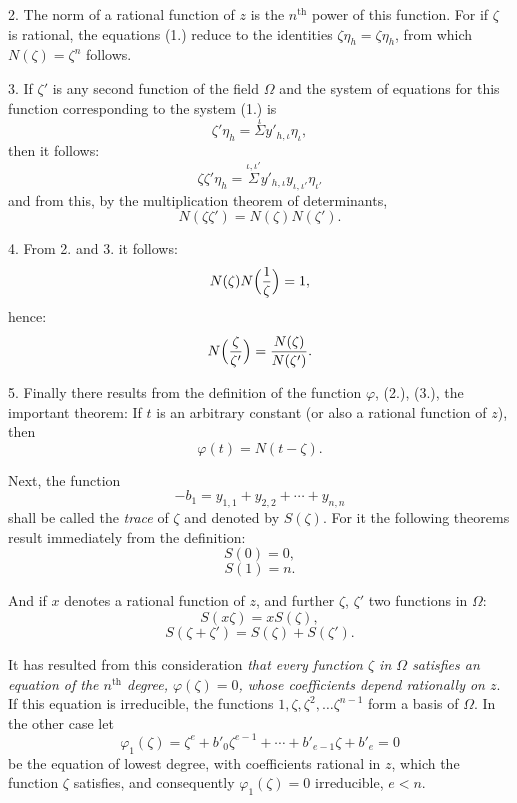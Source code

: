 \documentclass{article}
\begin{document}
2. The norm of a rational function of $z$ is the $n^{\text{th}}$ power of this function. For if $\zeta$ is rational, the equations (1.) reduce to the identities $\zeta\eta_{h} = \zeta\eta_{h}$, from which $N(\zeta) = \zeta^{n}$ follows.


3. If $\zeta'$ is any second function of the field $\Omega$ and the system of equations for this function corresponding to the system (1.) is
\[ \zeta'\eta_{h} = \overset{\iota}{\Sigma} y'_{h,\iota}\eta_{\iota}, \]
then it follows:
\[ \zeta\zeta'\eta_{h} = \overset{\iota,\iota'}{\Sigma} y'_{h,\iota}y_{\iota,\iota'}\eta_{\iota'} \]
and from this, by the multiplication theorem of determinants,
\[ N(\zeta\zeta') = N(\zeta)N(\zeta'). \]

4. From 2. and 3. it follows:
\[ N(\zeta)N\Bigl(\frac{1}{\zeta}\Bigr) = 1, \]
hence:
\[ N\Bigl(\frac{\zeta}{\zeta'}\Bigr) = \frac{N(\zeta)}{N(\zeta')}. \]

5. Finally there results from the definition of the function $\varphi$, (2.), (3.), the important theorem: If $t$ is an arbitrary constant (or also a rational function of $z$), then
\[ \varphi(t) = N(t-\zeta). \]

Next, the function
\[ -b_{1} = y_{1,1} + y_{2,2} + \cdots + y_{n,n} \tag{5.} \]
shall be called the \emph{trace} of $\zeta$ and denoted by $S(\zeta)$. For it the following theorems result immediately from the definition:
\[ S(0) = 0, \tag{6.} \]
\[ S(1) = n. \tag{7.} \]

And if $x$ denotes a rational function of $z$, and further $\zeta$, $\zeta'$ two functions in $\Omega$:
\[ S(x\zeta) = xS(\zeta), \tag{8.} \]
\[ S(\zeta+\zeta') = S(\zeta) + S(\zeta'). \tag{9.} \]

It has resulted from this consideration \emph{that every function $\zeta$ in $\Omega$ satisfies an equation of the $n^{\text{th}}$ degree, $\varphi(\zeta) = 0$, whose coefficients depend rationally on $z$}. If this equation is irreducible, the functions $1, \zeta, \zeta^{2}, \ldots \zeta^{n-1}$ form a basis of $\Omega$. In the other case let
\[ \varphi_{1}(\zeta) = \zeta^{e} + b'_{0}\zeta^{e-1} + \cdots + b'_{e-1}\zeta + b'_{e} = 0 \tag{10.} \]
be the equation of lowest degree, with coefficients rational in $z$, which the function $\zeta$ satisfies, and consequently $\varphi_{1}(\zeta) = 0$ irreducible, $e < n$.
\end{document}
